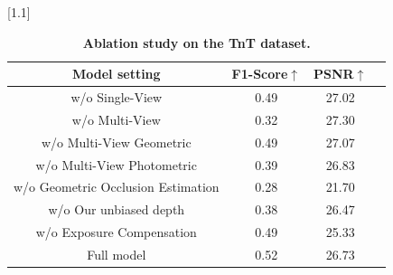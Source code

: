 \begin{table}\color{r}%
  \caption{\textcolor{r}{\textbf{Ablation study on the TnT dataset.}}}
  \label{tab:ablation}
  \scriptsize%
  \centering%
  \setlength{\tabcolsep}{5pt}
  \scalebox{1.1}[1.1]{
  \begin{tabu}{c|ccc}
  \toprule
     Model setting & F1-Score$\uparrow$ & PSNR$\uparrow$ \\
  \midrule
  w/o Single-View & 0.49 & 27.02  \\
  w/o Multi-View & 0.32 & 27.30  \\
  w/o Multi-View Geometric & 0.49 & 27.07  \\
  w/o Multi-View Photometric & 0.39 & 26.83  \\
  w/o Geometric Occlusion Estimation & 0.28 & 21.70  \\
  w/o Our unbiased depth & 0.38 & 26.47  \\
  w/o Exposure Compensation & 0.49 & 25.33  \\
  \midrule
  Full model & 0.52 & 26.73 \\
  \bottomrule
  \end{tabu}
  }
  \vspace{-0.3cm}
\end{table}
